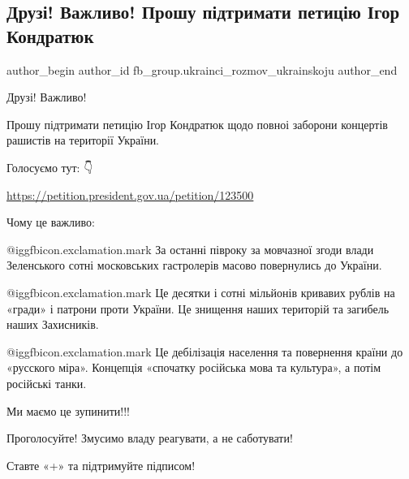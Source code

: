  
 
 
 
 
 
\subsection{Друзі! Важливо! Прошу підтримати петицію Ігор Кондратюк}
\label{sec:22_09_2021.fb.fb_group.ukrainci_rozmov_ukrainskoju.1.peticia_kondratjuk_zapret}
 
\ifcmt
 author_begin
   author_id fb_group.ukrainci_rozmov_ukrainskoju
 author_end
\fi

Друзі! Важливо! 

Прошу підтримати петицію Ігор Кондратюк щодо повноі заборони концертів рашистів на території України. 

Голосуємо тут: 👇

\url{https://petition.president.gov.ua/petition/123500}

Чому це важливо:

@igg{fbicon.exclamation.mark} За останні півроку за мовчазної згоди влади
Зеленського сотні московських гастролерів масово повернулись до України. 

@igg{fbicon.exclamation.mark} Це десятки і сотні мільйонів кривавих рублів на
«гради» і патрони проти України. Це знищення наших територій та загибель наших
Захисників.

@igg{fbicon.exclamation.mark} Це дебілізація населення та повернення країни до
«русского міра». Концепція «спочатку російська мова та культура», а потім
російські танки.

Ми маємо це зупинити!!!

Проголосуйте! Змусимо владу реагувати, а не саботувати! 

Ставте «+» та підтримуйте підписом!

